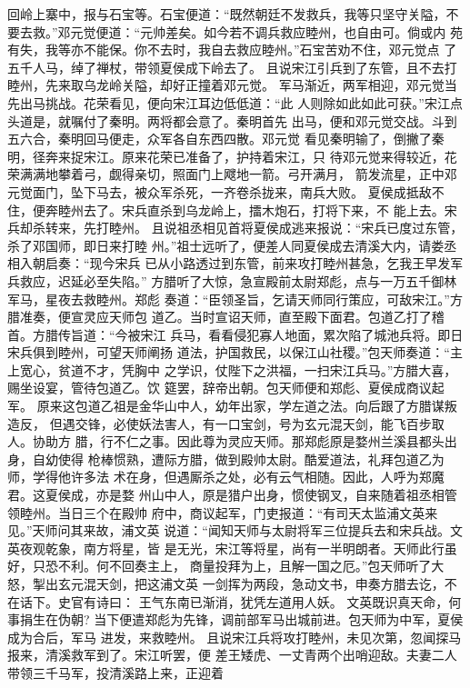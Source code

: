 回岭上寨中，报与石宝等。石宝便道：“既然朝廷不发救兵，我等只坚守关隘，不
要去救。”邓元觉便道：“元帅差矣。如今若不调兵救应睦州，也自由可。倘或内
苑有失，我等亦不能保。你不去时，我自去救应睦州。”石宝苦劝不住，邓元觉点
了五千人马，绰了禅杖，带领夏侯成下岭去了。
且说宋江引兵到了东管，且不去打睦州，先来取乌龙岭关隘，却好正撞着邓元觉。
军马渐近，两军相迎，邓元觉当先出马挑战。花荣看见，便向宋江耳边低低道：“此
人则除如此如此可获。”宋江点头道是，就嘱付了秦明。两将都会意了。秦明首先
出马，便和邓元觉交战。斗到五六合，秦明回马便走，众军各自东西四散。邓元觉
看见秦明输了，倒撇了秦明，径奔来捉宋江。原来花荣已准备了，护持着宋江，只
待邓元觉来得较近，花荣满满地攀着弓，觑得亲切，照面门上飕地一箭。弓开满月，
箭发流星，正中邓元觉面门，坠下马去，被众军杀死，一齐卷杀拢来，南兵大败。
夏侯成抵敌不住，便奔睦州去了。宋兵直杀到乌龙岭上，擂木炮石，打将下来，不
能上去。宋兵却杀转来，先打睦州。
且说祖丞相见首将夏侯成逃来报说：“宋兵已度过东管，杀了邓国师，即日来打睦
州。”祖士远听了，便差人同夏侯成去清溪大内，请娄丞相入朝启奏：“现今宋兵
已从小路透过到东管，前来攻打睦州甚急，乞我王早发军兵救应，迟延必至失陷。”
方腊听了大惊，急宣殿前太尉郑彪，点与一万五千御林军马，星夜去救睦州。郑彪
奏道：“臣领圣旨，乞请天师同行策应，可敌宋江。”方腊准奏，便宣灵应天师包
道乙。当时宣诏天师，直至殿下面君。包道乙打了稽首。方腊传旨道：“今被宋江
兵马，看看侵犯寡人地面，累次陷了城池兵将。即日宋兵俱到睦州，可望天师阐扬
道法，护国救民，以保江山社稷。”包天师奏道：“主上宽心，贫道不才，凭胸中
之学识，仗陛下之洪福，一扫宋江兵马。”方腊大喜，赐坐设宴，管待包道乙。饮
筵罢，辞帝出朝。包天师便和郑彪、夏侯成商议起军。
原来这包道乙祖是金华山中人，幼年出家，学左道之法。向后跟了方腊谋叛造反，
但遇交锋，必使妖法害人，有一口宝剑，号为玄元混天剑，能飞百步取人。协助方
腊，行不仁之事。因此尊为灵应天师。那郑彪原是婺州兰溪县都头出身，自幼使得
枪棒惯熟，遭际方腊，做到殿帅太尉。酷爱道法，礼拜包道乙为师，学得他许多法
术在身，但遇厮杀之处，必有云气相随。因此，人呼为郑魔君。这夏侯成，亦是婺
州山中人，原是猎户出身，惯使钢叉，自来随着祖丞相管领睦州。当日三个在殿帅
府中，商议起军，门吏报道：“有司天太监浦文英来见。”天师问其来故，浦文英
说道：“闻知天师与太尉将军三位提兵去和宋兵战。文英夜观乾象，南方将星，皆
是无光，宋江等将星，尚有一半明朗者。天师此行虽好，只恐不利。何不回奏主上，
商量投拜为上，且解一国之厄。”包天师听了大怒，掣出玄元混天剑，把这浦文英
一剑挥为两段，急动文书，申奏方腊去讫，不在话下。史官有诗曰：
王气东南已渐消，犹凭左道用人妖。
文英既识真天命，何事捐生在伪朝?
当下便遣郑彪为先锋，调前部军马出城前进。包天师为中军，夏侯成为合后，军马
进发，来救睦州。
且说宋江兵将攻打睦州，未见次第，忽闻探马报来，清溪救军到了。宋江听罢，便
差王矮虎、一丈青两个出哨迎敌。夫妻二人带领三千马军，投清溪路上来，正迎着
